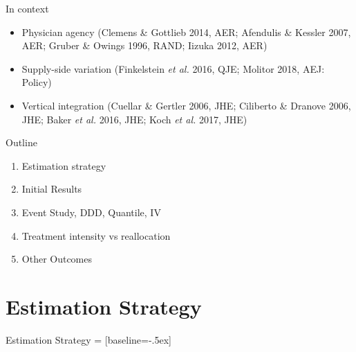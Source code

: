 \documentclass[t,aspectratio=169]{beamer}
\begin{document}
\begin{frame}{In context}
    \begin{itemize}
        \item Physician agency (Clemens \& Gottlieb 2014, AER; Afendulis \& Kessler 2007, AER; Gruber \& Owings 1996, RAND; Iizuka 2012, AER)
        \item Supply-side variation (Finkelstein \textit{et al.} 2016, QJE; Molitor 2018, AEJ: Policy)
        \item Vertical integration (Cuellar \& Gertler 2006, JHE; Ciliberto \& Dranove 2006, JHE; Baker \textit{et al.} 2016, JHE; Koch \textit{et al.} 2017, JHE)
    \end{itemize}
\end{frame}

\begin{frame}{Outline}
    \begin{enumerate}
        \item Estimation strategy
        \item Initial Results
        \item Event Study, DDD, Quantile, IV
        \item Treatment intensity vs reallocation
        \item Other Outcomes
    \end{enumerate}
\end{frame}

\section{Estimation Strategy}
\begin{frame}{Estimation Strategy}
     = [baseline=-.5ex]
\end{frame}
\end{document}
